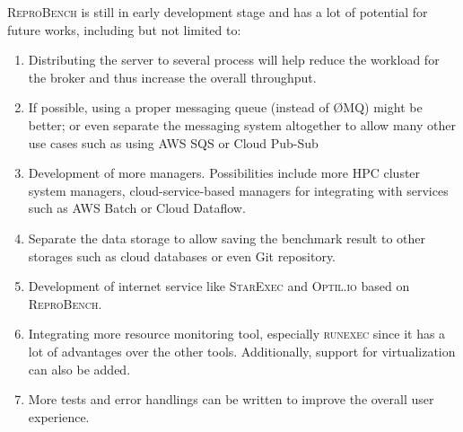 \textsc{ReproBench} is still in early development stage and has a lot of potential for future works, including but not limited to:
\begin{enumerate}
    \item Distributing the server to several process will help reduce the workload for the broker and thus increase the overall throughput.
    \item If possible, using a proper messaging queue (instead of \O MQ) might be better; or even separate the messaging system altogether to allow many other use cases such as using AWS SQS or Cloud Pub-Sub
    \item Development of more managers. Possibilities include more HPC cluster system managers, cloud-service-based managers for integrating with services such as AWS Batch or Cloud Dataflow.
    \item Separate the data storage to allow saving the benchmark result to other storages such as cloud databases or even Git repository.
    \item Development of internet service like \textsc{StarExec} and \textsc{Optil.io} based on \textsc{ReproBench}.
    \item Integrating more resource monitoring tool, especially \textsc{runexec} since it has a lot of advantages over the other tools. Additionally, support for virtualization can also be added.
    \item More tests and error handlings can be written to improve the overall user experience.
\end{enumerate}


